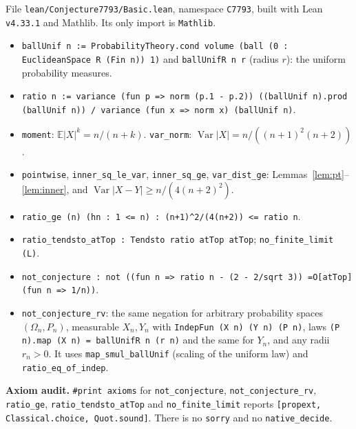 \documentclass[11pt]{article}
\newcommand{\E}{\mathbb{E}}
\newcommand{\Var}{\operatorname{Var}}
\begin{document}
File \texttt{lean/Conjecture7793/Basic.lean}, namespace \texttt{C7793}, built with Lean
\texttt{v4.33.1} and Mathlib. Its only import is \texttt{Mathlib}.
\begin{itemize}
\item \texttt{ballUnif n := ProbabilityTheory.cond volume (ball (0 : EuclideanSpace R (Fin n)) 1)}
  and \texttt{ballUnifR n r} (radius $r$): the uniform probability measures.
\item \texttt{ratio n := variance (fun p => norm (p.1 - p.2)) ((ballUnif n).prod (ballUnif n)) /
  variance (fun x => norm x) (ballUnif n)}.
\item \texttt{moment}: $\E|X|^k = n/(n+k)$. \texttt{var\_norm}: $\Var|X| = n/((n+1)^2(n+2))$.
\item \texttt{pointwise}, \texttt{inner\_sq\_le\_var}, \texttt{inner\_sq\_ge}, \texttt{var\_dist\_ge}:
  Lemmas~\ref{lem:pt}--\ref{lem:inner}, and $\Var|X-Y| \ge n/(4(n+2)^2)$.
\item \texttt{ratio\_ge (n) (hn : 1 <= n) : (n+1)\^{}2/(4(n+2)) <= ratio n}.
\item \texttt{ratio\_tendsto\_atTop : Tendsto ratio atTop atTop}; \texttt{no\_finite\_limit (L)}.
\item \texttt{not\_conjecture : not ((fun n => ratio n - (2 - 2/sqrt 3)) =O[atTop] (fun n => 1/n))}.
\item \texttt{not\_conjecture\_rv}: the same negation for arbitrary probability spaces $(\Omega_n, P_n)$,
  measurable $X_n, Y_n$ with \texttt{IndepFun (X n) (Y n) (P n)}, laws
  \texttt{(P n).map (X n) = ballUnifR n (r n)} and the same for $Y_n$, and any radii $r_n > 0$. It uses
  \texttt{map\_smul\_ballUnif} (scaling of the uniform law) and \texttt{ratio\_eq\_of\_indep}.
\end{itemize}
\textbf{Axiom audit.} \texttt{\#print axioms} for \texttt{not\_conjecture}, \texttt{not\_conjecture\_rv},
\texttt{ratio\_ge}, \texttt{ratio\_tendsto\_atTop} and \texttt{no\_finite\_limit} reports
\texttt{[propext, Classical.choice, Quot.sound]}. There is no \texttt{sorry} and no \texttt{native\_decide}.
\end{document}
